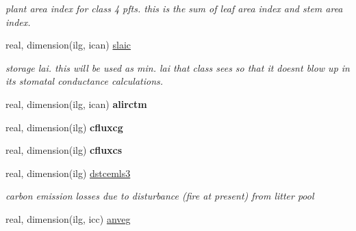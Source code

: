 \begin{DoxyCompactItemize}
\begin{DoxyCompactList}\small\item\em plant area index for class\textquotesingle{} 4 pfts. this is the sum of leaf area index and stem area index. \end{DoxyCompactList}\item 
\hypertarget{structctem__statevars_1_1veg__gat_a98953fd6bd2f597f2cc0b61ab2a5d9ba}{}real, dimension(ilg, ican) \hyperlink{structctem__statevars_1_1veg__gat_a98953fd6bd2f597f2cc0b61ab2a5d9ba}{slaic}\label{structctem__statevars_1_1veg__gat_a98953fd6bd2f597f2cc0b61ab2a5d9ba}

\begin{DoxyCompactList}\small\item\em storage lai. this will be used as min. lai that class sees so that it doesn\textquotesingle{}t blow up in its stomatal conductance calculations. \end{DoxyCompactList}\item 
\hypertarget{structctem__statevars_1_1veg__gat_a86ea8eeea5c36a73bd27ce073705ae74}{}real, dimension(ilg, ican) {\bfseries alirctm}\label{structctem__statevars_1_1veg__gat_a86ea8eeea5c36a73bd27ce073705ae74}

\item 
\hypertarget{structctem__statevars_1_1veg__gat_aeef6566e82218dd656f1b074d62a82a9}{}real, dimension(ilg) {\bfseries cfluxcg}\label{structctem__statevars_1_1veg__gat_aeef6566e82218dd656f1b074d62a82a9}

\item 
\hypertarget{structctem__statevars_1_1veg__gat_a68c0b004a69e8a69dfcd9efc6ded0cdd}{}real, dimension(ilg) {\bfseries cfluxcs}\label{structctem__statevars_1_1veg__gat_a68c0b004a69e8a69dfcd9efc6ded0cdd}

\item 
\hypertarget{structctem__statevars_1_1veg__gat_ab34a60d0d1e3b3b0c76af0cb61d331ab}{}real, dimension(ilg) \hyperlink{structctem__statevars_1_1veg__gat_ab34a60d0d1e3b3b0c76af0cb61d331ab}{dstcemls3}\label{structctem__statevars_1_1veg__gat_ab34a60d0d1e3b3b0c76af0cb61d331ab}

\begin{DoxyCompactList}\small\item\em carbon emission losses due to disturbance (fire at present) from litter pool \end{DoxyCompactList}\item 
\hypertarget{structctem__statevars_1_1veg__gat_a7764723050312189f092c5783d86653e}{}real, dimension(ilg, icc) \hyperlink{structctem__statevars_1_1veg__gat_a7764723050312189f092c5783d86653e}{anveg}\label{structctem__statevars_1_1veg__gat_a7764723050312189f092c5783d86653e}


\end{DoxyCompactItemize}
